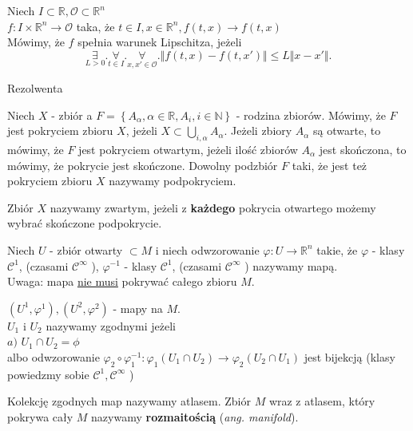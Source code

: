 \documentclass{article}
\begin{document}
\begin{definicja}
Niech $I\subset \mathbb{R}, \mathcal{O}\subset \mathbb{R}^n$ \\
$f: I\times\mathbb{R}^n \to \mathcal{O}$ taka, że $t\in I, x\in \mathbb{R}^n, f(t,x) \to f(t,x)$\\
Mówimy, że $f$ spełnia warunek Lipschitza, jeżeli
\[
\underset{L>0}{\exists}. \underset{t\in I}{\forall}. \underset{x,x'\in \mathcal{O}}{\forall}. \Vert f(t,x) - f(t,x')  \Vert \leq L \Vert x - x' \Vert
.\]
\end{definicja}
\begin{definicja}
Rezolwenta\\
\end{definicja}
\begin{definicja}
Niech $X$ - zbiór a $F = \left\{ A_\alpha, \alpha\in\mathbb{R}, A_i, i\in\mathbb{N} \right\} $ - rodzina zbiorów. Mówimy, że $F$ jest pokryciem zbioru $X$, jeżeli $X\subset \bigcup_{i,\alpha}A_\alpha$. Jeżeli zbiory $A_\alpha$ są otwarte, to mówimy, że $F$ jest pokryciem otwartym, jeżeli ilość zbiorów $A_\alpha$ jest skończona, to mówimy, że pokrycie jest skończone. Dowolny podzbiór $F$ taki, że jest też pokryciem zbioru $X$ nazywamy podpokryciem.
\end{definicja}
\begin{definicja}
Zbiór $X$ nazywamy zwartym, jeżeli z \textbf{każdego} pokrycia otwartego możemy wybrać skończone podpokrycie.
\end{definicja}
\begin{definicja}
Niech $U$ - zbiór otwarty $\subset M$ i niech odwzorowanie $\varphi: U\to \mathbb{R}^n$ takie, że $\varphi$ - klasy $\mathcal{C}^1$, (czasami $\mathcal{C}^\infty$ ), $\varphi^{-1}$ - klasy $\mathcal{C}^1$, (czasami $\mathcal{C}^\infty$ ) nazywamy mapą.\\
Uwaga: mapa \underline{nie musi} pokrywać całego zbioru $M$.
\end{definicja}
\begin{definicja}
$(U^1,\varphi^1), (U^2,\varphi^2)$ - mapy na $M$.\\
$U_1$ i $U_2$ nazywamy zgodnymi jeżeli\\
$a)$ $U_1\cap U_2 = \phi$\\
albo odwzorowanie $\varphi_2 \circ \varphi_1^{-1}: \varphi_1(U_1\cap U_2)\to \varphi_2(U_2\cap U_1)$ jest bijekcją (klasy powiedzmy sobie $\mathcal{C}^1, \mathcal{C}^{\infty}$ )
\end{definicja}
\begin{definicja}
Kolekcję zgodnych map nazywamy atlasem. Zbiór $M$ wraz z atlasem, który pokrywa cały $M$ nazywamy \textbf{rozmaitością} (\textit{ang. manifold}).
\end{definicja}
\end{document}
